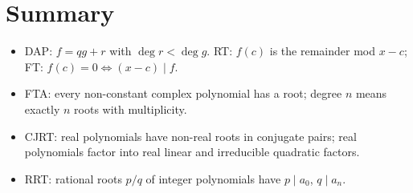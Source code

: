 \section{Summary}
\begin{itemize}
  \item DAP: $f = qg + r$ with $\deg r < \deg g$. RT: $f(c)$ is the remainder mod $x - c$;
        FT: $f(c) = 0 \iff (x - c)\mid f$.
  \item FTA: every non-constant complex polynomial has a root; degree $n$ means exactly $n$
        roots with multiplicity.
  \item CJRT: real polynomials have non-real roots in conjugate pairs; real polynomials factor
        into real linear and irreducible quadratic factors.
  \item RRT: rational roots $p/q$ of integer polynomials have $p \mid a_0$, $q \mid a_n$.
\end{itemize}
